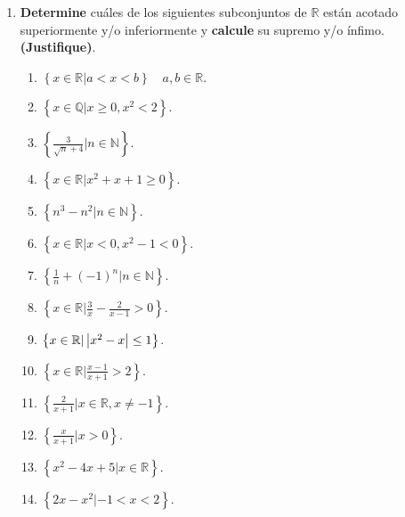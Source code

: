 \documentclass[12pt]{article}
\begin{document}
\begin{enumerate}
\begin{proof}
\begin{equation*}
\begin{split}
                =&\frac{\sen\left(\frac{2k+1}{2}t+t\right)}{2\sen\frac{t}{2}}\\
                =&\frac{\sen\frac{2k+3}{2}t}{2\sen\frac{t}{2}}\\
                =&\frac{\sen\frac{2(k+1)+1}{2}t}{2\sen\frac{t}{2}}\\
            \end{split}
        \end{equation*}
        De esta forma, el resultado se cumple para $n=k+1$. Aplicando inducción, el resultado se cumple para toda $n\in\mathbb{N}$.
        \qed
    \end{proof}
    \item \textbf{Determine} cuáles de los siguientes subconjuntos de $\mathbb{R}$ están acotado superiormente y/o inferiormente y \textbf{calcule} su supremo y/o ínfimo. \textbf{(Justifique)}.
    \begin{multicols}{2}
        \begin{enumerate}
            \item $\left\{x\in\mathbb{R}|a<x<b\right\}\quad a,b\in\mathbb{R}$.
            \item $\left\{x\in\mathbb{Q}|x\geq0, x^2<2\right\}$.
            \item $\left\{\frac{3}{\sqrt{n}+4}|n\in\mathbb{N}\right\}$.
            \item $\left\{x\in\mathbb{R}|x^2+x+1\geq 0\right\}$.
            \item $\left\{n^3-n^2|n\in\mathbb{N}\right\}$.
            \item $\left\{x\in\mathbb{R}|x<0,x^2-1<0\right\}$.
            \item $\left\{\frac{1}{n}+\left(-1\right)^n|n\in\mathbb{N}\right\}$.
            \item $\left\{x\in\mathbb{R}|\frac{3}{x}-\frac{2}{x-1}>0\right\}$.
            \item $\left\{x\in\mathbb{R}|\left| x^2-x \right|\leq1\right\}$.
            \item $\left\{x\in\mathbb{R}|\frac{x-1}{x+1}>2\right\}$.
            \item $\left\{\frac{2}{x+1}|x\in\mathbb{R},x\neq -1\right\}$.
            \item $\left\{\frac{x}{x+1}|x>0\right\}$.
            \item $\left\{x^2-4x+5|x\in\mathbb{R}\right\}$.
            \item $\left\{2x-x^2|-1<x<2\right\}$.
        \end{enumerate}
    \end{multicols}

\end{enumerate}
\end{document}
